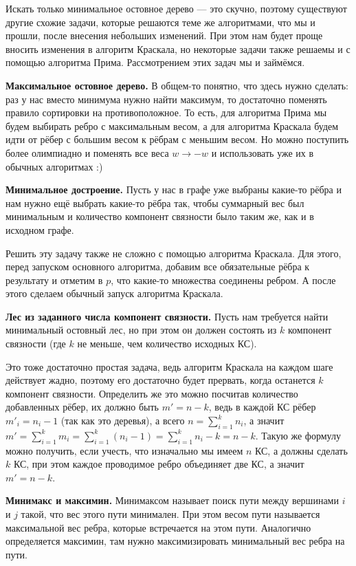 Искать только минимальное остовное дерево — это скучно, поэтому существуют другие схожие задачи, которые решаются теме же алгоритмами, что мы и прошли, после внесения небольших изменений. При этом нам будет проще вносить изменения в алгоритм Краскала, но некоторые задачи также решаемы и с помощью алгоритма Прима. Рассмотрением этих задач мы и займёмся.

\textbf{Максимальное остовное дерево.} В общем-то понятно, что здесь нужно сделать: раз у нас вместо минимума нужно найти максимум, то достаточно поменять правило сортировки на противоположное. То есть, для алгоритма Прима мы будем выбирать ребро с максимальным весом, а для алгоритма Краскала будем идти от рёбер с большим весом к рёбрам с меньшим весом. Но можно поступить более олимпиадно и поменять все веса $w \to -w$ и использовать уже их в обычных алгоритмах :)

\textbf{Минимальное достроение.} Пусть у нас в графе уже выбраны какие-то рёбра и нам нужно ещё выбрать какие-то рёбра так, чтобы суммарный вес был минимальным и количество компонент связности было таким же, как и в исходном графе.

Решить эту задачу также не сложно с помощью алгоритма Краскала. Для этого, перед запуском основного алгоритма, добавим все обязательные рёбра к результату и отметим в $p$, что какие-то множества соединены ребром. А после этого сделаем обычный запуск алгоритма Краскала.

\textbf{Лес из заданного числа компонент связности.} Пусть нам требуется найти минимальный остовный лес, но при этом он должен состоять из $k$ компонент связности (где $k$ не меньше, чем количество исходных КС).

Это тоже достаточно простая задача, ведь алгоритм Краскала на каждом шаге действует жадно, поэтому его достаточно будет прервать, когда останется $k$ компонент связности. Определить же это можно посчитав количество добавленных рёбер, их должно быть $m' = n - k$, ведь в каждой КС рёбер $m'_i = n_i - 1$ (так как это деревья), а всего $n = \sum\limits_{i = 1}^{k} n_i$, а значит $m' = \sum\limits_{i = 1}^{k} m_i = \sum\limits_{i = 1}^{k} (n_i - 1) = \sum\limits_{i = 1}^{k} n_i - k = n - k$. Такую же формулу можно получить, если учесть, что изначально мы имеем $n$ КС, а должны сделать $k$ КС, при этом каждое проводимое ребро объединяет две КС, а значит $m' = n - k$.

\textbf{Минимакс и максимин.} Минимаксом называет поиск пути между вершинами $i$ и $j$ такой, что вес этого пути минимален. При этом весом пути называется максимальной вес ребра, которые встречается на этом пути. Аналогично определяется максимин, там нужно максимизировать минимальный вес ребра на пути.

